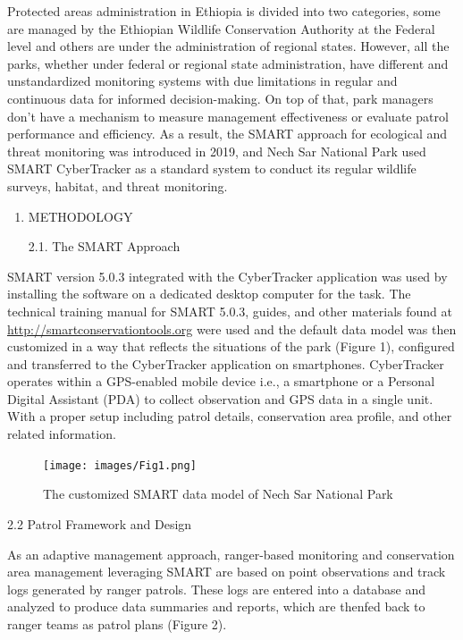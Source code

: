 \documentclass[
  letterpaper,
  DIV=11,
  numbers=noendperiod]{scrartcl}
\begin{document}
Protected areas administration in Ethiopia is divided into two
categories, some are managed by the Ethiopian Wildlife Conservation
Authority at the Federal level and others are under the administration
of regional states. However, all the parks, whether under federal or
regional state administration, have different and unstandardized
monitoring systems with due limitations in regular and continuous data
for informed decision-making. On top of that, park managers don't have a
mechanism to measure management effectiveness or evaluate patrol
performance and efficiency. As a result, the SMART approach for
ecological and threat monitoring was introduced in 2019, and Nech Sar
National Park used SMART CyberTracker as a standard system to conduct
its regular wildlife surveys, habitat, and threat monitoring.

\begin{enumerate}
\def\labelenumi{\arabic{enumi}.}
\setcounter{enumi}{1}
\item
  METHODOLOGY

  2.1. The SMART Approach
\end{enumerate}

SMART version 5.0.3 integrated with the CyberTracker application was
used by installing the software on a dedicated desktop computer for the
task. The technical training manual for SMART 5.0.3, guides, and other
materials found at \url{http://smartconservationtools.org} were used and
the default data model was then customized in a way that reflects the
situations of the park (Figure 1), configured and transferred to the
CyberTracker application on smartphones. CyberTracker operates within a
GPS-enabled mobile device i.e., a smartphone or a Personal Digital
Assistant (PDA) to collect observation and GPS data in a single unit.
With a proper setup including patrol details, conservation area profile,
and other related information.

\begin{figure}[H]

{\centering \texttt{[image: images/Fig1.png]}

}

\caption{The customized SMART data model of Nech Sar National Park}

\end{figure}%

2.2 Patrol Framework and Design

As an adaptive management approach, ranger-based monitoring and
conservation area management leveraging SMART are based on point
observations and track logs generated by ranger patrols. These logs are
entered into a database and analyzed to produce data summaries and
reports, which are thenfed back to ranger teams as patrol plans (Figure
2).
\end{document}
